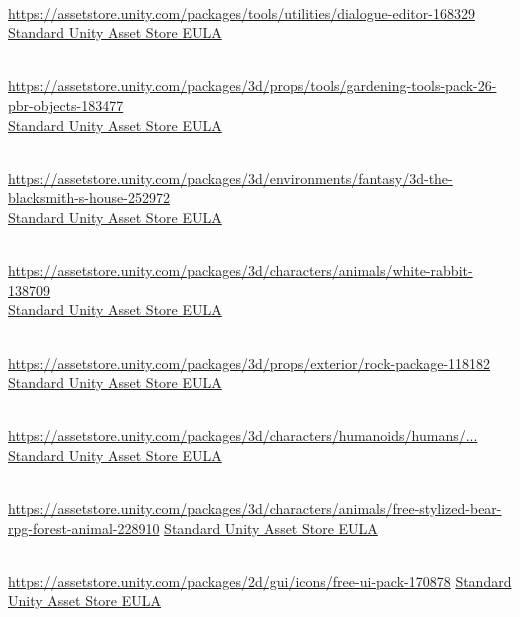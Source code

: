 \begin{description}[]
\item[Dialogue Editor] \hfill \\ \url{https://assetstore.unity.com/packages/tools/utilities/dialogue-editor-168329} \\
  \href{https://unity.com/legal/as-terms}{Standard Unity Asset Store EULA}

\item[Gardening Tools Pack - 26 PBR objects] \hfill \\ \url{https://assetstore.unity.com/packages/3d/props/tools/gardening-tools-pack-26-pbr-objects-183477} \\
  \href{https://unity.com/legal/as-terms}{Standard Unity Asset Store EULA}

\item[3D The Blacksmith's House] \hfill \\ \url{https://assetstore.unity.com/packages/3d/environments/fantasy/3d-the-blacksmith-s-house-252972} \\
  \href{https://unity.com/legal/as-terms}{Standard Unity Asset Store EULA}

\item[White Rabbit] \hfill \\ \url{https://assetstore.unity.com/packages/3d/characters/animals/white-rabbit-138709} \\
  \href{https://unity.com/legal/as-terms}{Standard Unity Asset Store EULA}

\item[Rock package] \hfill \\ \url{https://assetstore.unity.com/packages/3d/props/exterior/rock-package-118182} \\
  \href{https://unity.com/legal/as-terms}{Standard Unity Asset Store EULA}

\item[FREE - Modular Character - Fantasy RPG Human Male] \hfill \\ \href{https://assetstore.unity.com/packages/3d/characters/humanoids/humans/free-modular-character-fantasy-rpg-human-male-228952}{https://assetstore.unity.com/packages/3d/characters/humanoids/humans/...} \\
  \href{https://unity.com/legal/as-terms}{Standard Unity Asset Store EULA}

\item[FREE Stylized Bear - RPG Forest Animal] \hfill \\ \url{https://assetstore.unity.com/packages/3d/characters/animals/free-stylized-bear-rpg-forest-animal-228910}
  \href{https://unity.com/legal/as-terms}{Standard Unity Asset Store EULA}

\item[Free Ui Pack] \hfill \\ \url{https://assetstore.unity.com/packages/2d/gui/icons/free-ui-pack-170878}
  \href{https://unity.com/legal/as-terms}{Standard Unity Asset Store EULA}
\end{description}
%
%
%
%
